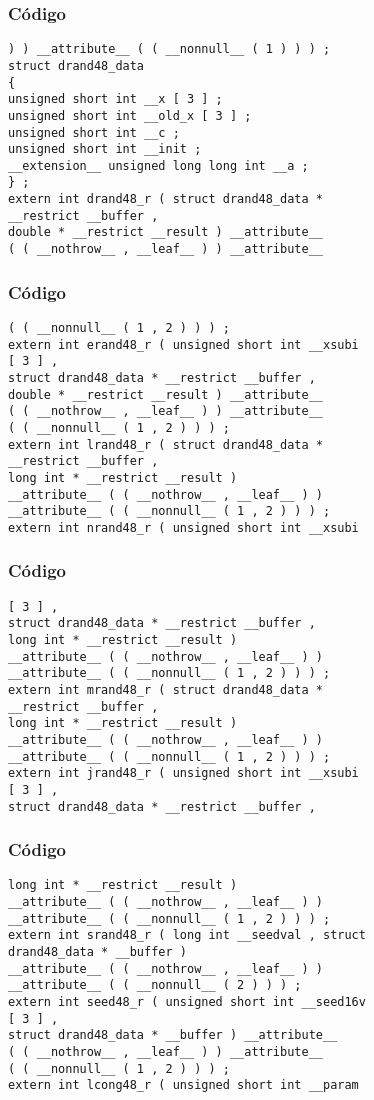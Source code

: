 \documentclass{beamer}
\begin{document}
\begin{frame}[fragile]
\frametitle{C\'odigo}
\begin{verbatim}
) ) __attribute__ ( ( __nonnull__ ( 1 ) ) ) ; 
struct drand48_data 
{ 
unsigned short int __x [ 3 ] ; 
unsigned short int __old_x [ 3 ] ; 
unsigned short int __c ; 
unsigned short int __init ; 
__extension__ unsigned long long int __a ; 
} ; 
extern int drand48_r ( struct drand48_data * 
__restrict __buffer , 
double * __restrict __result ) __attribute__ 
( ( __nothrow__ , __leaf__ ) ) __attribute__ 
\end{verbatim}
\end{frame}
\begin{frame}[fragile]
\frametitle{C\'odigo}
\begin{verbatim}
( ( __nonnull__ ( 1 , 2 ) ) ) ; 
extern int erand48_r ( unsigned short int __xsubi 
[ 3 ] , 
struct drand48_data * __restrict __buffer , 
double * __restrict __result ) __attribute__ 
( ( __nothrow__ , __leaf__ ) ) __attribute__ 
( ( __nonnull__ ( 1 , 2 ) ) ) ; 
extern int lrand48_r ( struct drand48_data * 
__restrict __buffer , 
long int * __restrict __result ) 
__attribute__ ( ( __nothrow__ , __leaf__ ) ) 
__attribute__ ( ( __nonnull__ ( 1 , 2 ) ) ) ; 
extern int nrand48_r ( unsigned short int __xsubi 
\end{verbatim}
\end{frame}
\begin{frame}[fragile]
\frametitle{C\'odigo}
\begin{verbatim}
[ 3 ] , 
struct drand48_data * __restrict __buffer , 
long int * __restrict __result ) 
__attribute__ ( ( __nothrow__ , __leaf__ ) ) 
__attribute__ ( ( __nonnull__ ( 1 , 2 ) ) ) ; 
extern int mrand48_r ( struct drand48_data * 
__restrict __buffer , 
long int * __restrict __result ) 
__attribute__ ( ( __nothrow__ , __leaf__ ) ) 
__attribute__ ( ( __nonnull__ ( 1 , 2 ) ) ) ; 
extern int jrand48_r ( unsigned short int __xsubi 
[ 3 ] , 
struct drand48_data * __restrict __buffer , 
\end{verbatim}
\end{frame}
\begin{frame}[fragile]
\frametitle{C\'odigo}
\begin{verbatim}
long int * __restrict __result ) 
__attribute__ ( ( __nothrow__ , __leaf__ ) ) 
__attribute__ ( ( __nonnull__ ( 1 , 2 ) ) ) ; 
extern int srand48_r ( long int __seedval , struct 
drand48_data * __buffer ) 
__attribute__ ( ( __nothrow__ , __leaf__ ) ) 
__attribute__ ( ( __nonnull__ ( 2 ) ) ) ; 
extern int seed48_r ( unsigned short int __seed16v 
[ 3 ] , 
struct drand48_data * __buffer ) __attribute__ 
( ( __nothrow__ , __leaf__ ) ) __attribute__ 
( ( __nonnull__ ( 1 , 2 ) ) ) ; 
extern int lcong48_r ( unsigned short int __param 
\end{verbatim}
\end{frame}
\end{document}
